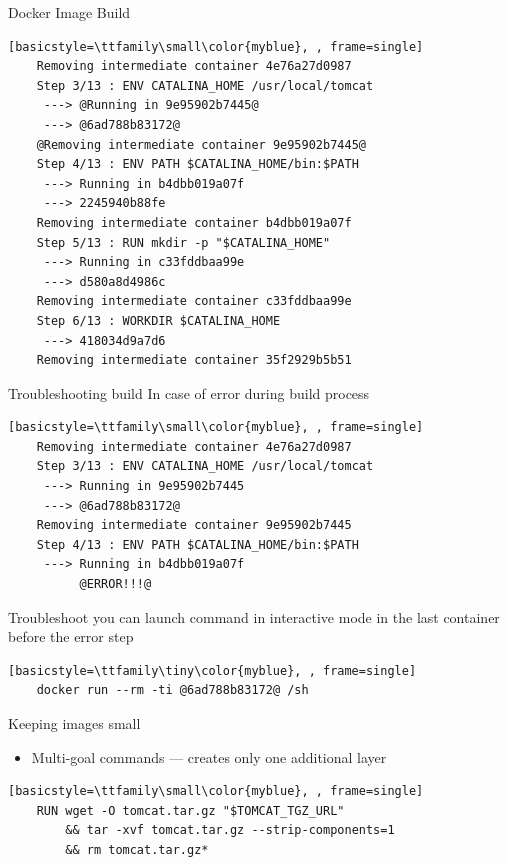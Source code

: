 \begin{frame}[fragile]{Docker Image Build}
  \begin{lstlisting}[basicstyle=\ttfamily\small\color{myblue}, , frame=single]
    Removing intermediate container 4e76a27d0987
    Step 3/13 : ENV CATALINA_HOME /usr/local/tomcat
     ---> @Running in 9e95902b7445@
     ---> @6ad788b83172@
    @Removing intermediate container 9e95902b7445@
    Step 4/13 : ENV PATH $CATALINA_HOME/bin:$PATH
     ---> Running in b4dbb019a07f
     ---> 2245940b88fe
    Removing intermediate container b4dbb019a07f
    Step 5/13 : RUN mkdir -p "$CATALINA_HOME"
     ---> Running in c33fddbaa99e
     ---> d580a8d4986c
    Removing intermediate container c33fddbaa99e
    Step 6/13 : WORKDIR $CATALINA_HOME
     ---> 418034d9a7d6
    Removing intermediate container 35f2929b5b51
  \end{lstlisting}  
\end{frame}

\begin{frame}[fragile]{Troubleshooting build}
In case of error during build process
\begin{lstlisting}[basicstyle=\ttfamily\small\color{myblue}, , frame=single]
    Removing intermediate container 4e76a27d0987
    Step 3/13 : ENV CATALINA_HOME /usr/local/tomcat
     ---> Running in 9e95902b7445
     ---> @6ad788b83172@
    Removing intermediate container 9e95902b7445
    Step 4/13 : ENV PATH $CATALINA_HOME/bin:$PATH
     ---> Running in b4dbb019a07f
          @ERROR!!!@
  \end{lstlisting}  
  \begin{exampleblock}{Troubleshoot}
  you can launch command in interactive mode in the last container before the error step
  \begin{lstlisting}[basicstyle=\ttfamily\tiny\color{myblue}, , frame=single]
    docker run --rm -ti @6ad788b83172@ /sh
  \end{lstlisting} 
  \end{exampleblock}
   
\end{frame}

\begin{frame}[fragile]{Keeping images small}
  \begin{itemize}
    \item Multi-goal commands --- creates only one additional layer    
  \end{itemize}  
  \begin{lstlisting}[basicstyle=\ttfamily\small\color{myblue}, , frame=single]
    RUN wget -O tomcat.tar.gz "$TOMCAT_TGZ_URL" 
        && tar -xvf tomcat.tar.gz --strip-components=1 
        && rm tomcat.tar.gz*
  \end{lstlisting}
\end{frame}

